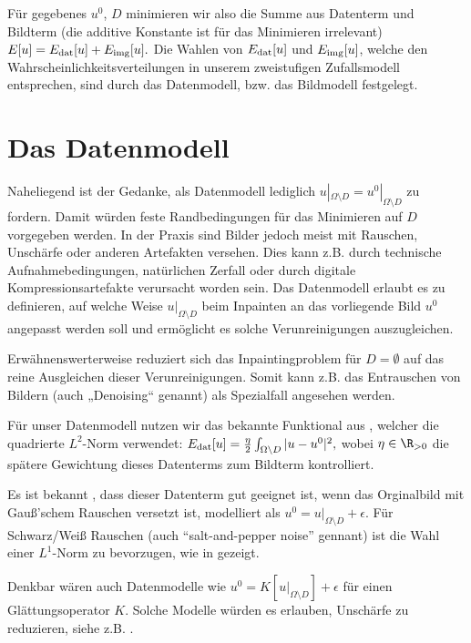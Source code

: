 \documentclass{mythesis}
\begin{document}
Für gegebenes $u^0$, $D$ minimieren wir also die Summe aus Datenterm und Bildterm (die additive Konstante ist für das Minimieren irrelevant)
\begin{math}
    E[u] = E_{\mathrm{dat}}[u] + E_{\mathrm{img}}[u].
\end{math}
Die Wahlen von $E_{\mathrm{dat}}[u]$ und $E_{\mathrm{img}}[u]$, welche den Wahrscheinlichkeitsverteilungen in unserem zweistufigen Zufallsmodell entsprechen, sind durch das Datenmodell, bzw. das Bildmodell festgelegt.


\section{Das Datenmodell}

Naheliegend ist der Gedanke, als Datenmodell lediglich $u|_{\Omega \setminus D} = u^0|_{\Omega \setminus D}$ zu fordern.
Damit würden feste Randbedingungen für das Minimieren auf $D$ vorgegeben werden.
In der Praxis sind Bilder jedoch meist mit Rauschen, Unschärfe oder anderen Artefakten versehen.
Dies kann z.B. durch technische Aufnahmebedingungen, natürlichen Zerfall oder durch digitale Kompressionsartefakte verursacht worden sein.
Das Datenmodell erlaubt es zu definieren, auf welche Weise $u|_{\Omega \setminus D}$ beim Inpainten an das vorliegende Bild $u^0$ angepasst werden soll und ermöglicht es solche Verunreinigungen auszugleichen.

Erwähnenswerterweise reduziert sich das Inpaintingproblem für $D = \emptyset$ auf das reine Ausgleichen dieser Verunreinigungen.
Somit kann z.B. das Entrauschen von Bildern (auch „Denoising“ genannt) als Spezialfall angesehen werden.

Für unser Datenmodell nutzen wir das bekannte Funktional aus \cite{rudin1992nonlinear}, welcher die quadrierte $L^2$-Norm verwendet:
\begin{math}
    E_{\mathrm{dat}}[u] = \frac{\eta}{2} \int_{\Omega \setminus D} |u - u^0|^2,
\end{math}
wobei $\eta \in \R_{> 0}$ die spätere Gewichtung dieses Datenterms zum Bildterm kontrolliert.

Es ist bekannt \cite[§4.5]{chan2005image}, dass dieser Datenterm gut geeignet ist, wenn das Orginalbild mit Gauß'schem Rauschen versetzt ist, modelliert als $u^0 = u|_{\Omega \setminus D} + \epsilon$.
Für Schwarz/Weiß Rauschen (auch “salt-and-pepper noise” gennant) ist die Wahl einer $L^1$-Norm zu bevorzugen, wie in \cite{nikolova2004variational} gezeigt.

Denkbar wären auch Datenmodelle wie $u^0 = K[u|_{\Omega\setminus D}] + \epsilon$ für einen Glättungsoperator $K$.
Solche Modelle würden es erlauben, Unschärfe zu reduzieren, siehe z.B. \cite{rudin1994total}.
\end{document}

